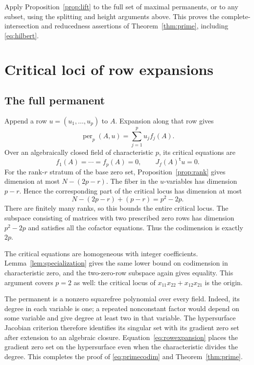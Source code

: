 \documentclass[11pt]{article}
\theoremstyle{definition}\newtheorem{definition}[theorem]{Definition}
\theoremstyle{remark}\newtheorem{remark}[theorem]{Remark}
\DeclareMathOperator{\per}{per}
\numberwithin{equation}{section}
\begin{document}
Apply Proposition~\ref{prop:lift} to the full set of maximal
permanents, or to any subset, using the splitting and height
arguments above. This proves the complete-intersection and
reducedness assertions of Theorem~\ref{thm:prime}, including
\eqref{eq:hilbert}.

\section{Critical loci of row expansions}
\subsection{The full permanent}
Append a row $u=(u_1,\ldots,u_p)$ to $A$. Expansion along that
row gives
\begin{equation}\label{eq:rowexpansion}
 \per_p(A,u)=\sum_{j=1}^{p}u_jf_j(A).
\end{equation}
Over an algebraically closed field of characteristic $p$, its
critical equations are
\begin{equation}\label{eq:critical}
 f_1(A)=\cdots=f_p(A)=0,\qquad J_f(A)^{\mathsf t}u=0.
\end{equation}
For the rank-$r$ stratum of the base zero set,
Proposition~\ref{prop:rank} gives dimension at most
$N-(2p-r)$. The fiber in the $u$-variables has dimension $p-r$.
Hence the corresponding part of the critical locus has dimension
at most
\[
 N-(2p-r)+(p-r)=p^2-2p.
\]
There are finitely many ranks, so this bounds the entire critical
locus. The subspace consisting of matrices with two prescribed
zero rows has dimension $p^2-2p$ and satisfies all the cofactor
equations. Thus the codimension is exactly $2p$.

The critical equations are homogeneous with integer coefficients.
Lemma~\ref{lem:specialization} gives the same lower bound on
codimension in characteristic zero, and the two-zero-row subspace
again gives equality. This argument covers $p=2$ as well: the
critical locus of $x_{11}x_{22}+x_{12}x_{21}$ is the origin.

The permanent is a nonzero squarefree polynomial over every field.
Indeed, its degree in each variable is one; a repeated nonconstant
factor would depend on some variable and give degree at least two
in that variable. The hypersurface Jacobian criterion therefore
identifies its singular set with its gradient zero set after
extension to an algebraic closure. Equation~\eqref{eq:rowexpansion}
places the gradient zero set on the hypersurface even when the
characteristic divides the degree. This completes the proof of
\eqref{eq:primecodim} and Theorem~\ref{thm:prime}.
\end{document}
